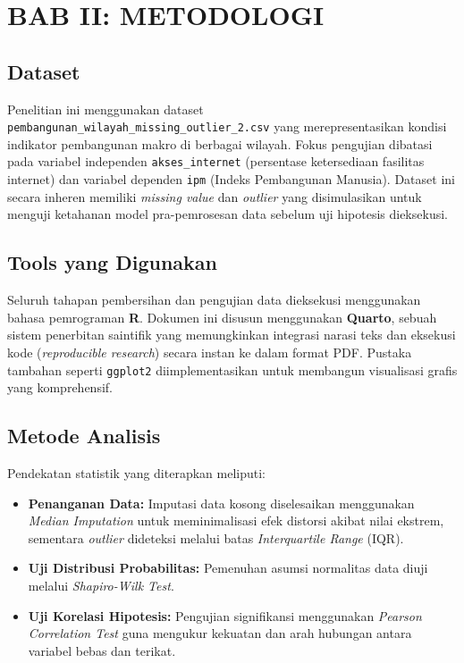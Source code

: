 \documentclass[
  letterpaper,
  DIV=11,
  numbers=noendperiod]{scrartcl}
\providecommand{\tightlist}{%
  \setlength{\itemsep}{0pt}\setlength{\parskip}{0pt}}
\begin{document}
\section{BAB II: METODOLOGI}\label{bab-ii-metodologi}

\subsection{Dataset}\label{dataset}

Penelitian ini menggunakan dataset
\texttt{pembangunan\_wilayah\_missing\_outlier\_2.csv} yang
merepresentasikan kondisi indikator pembangunan makro di berbagai
wilayah. Fokus pengujian dibatasi pada variabel independen
\texttt{akses\_internet} (persentase ketersediaan fasilitas internet)
dan variabel dependen \texttt{ipm} (Indeks Pembangunan Manusia). Dataset
ini secara inheren memiliki \emph{missing value} dan \emph{outlier} yang
disimulasikan untuk menguji ketahanan model pra-pemrosesan data sebelum
uji hipotesis dieksekusi.

\subsection{Tools yang Digunakan}\label{tools-yang-digunakan}

Seluruh tahapan pembersihan dan pengujian data dieksekusi menggunakan
bahasa pemrograman \textbf{R}. Dokumen ini disusun menggunakan
\textbf{Quarto}, sebuah sistem penerbitan saintifik yang memungkinkan
integrasi narasi teks dan eksekusi kode (\emph{reproducible research})
secara instan ke dalam format PDF. Pustaka tambahan seperti
\texttt{ggplot2} diimplementasikan untuk membangun visualisasi grafis
yang komprehensif.

\subsection{Metode Analisis}\label{metode-analisis}

Pendekatan statistik yang diterapkan meliputi:

\begin{itemize}
\tightlist
\item
  \textbf{Penanganan Data:} Imputasi data kosong diselesaikan
  menggunakan \emph{Median Imputation} untuk meminimalisasi efek
  distorsi akibat nilai ekstrem, sementara \emph{outlier} dideteksi
  melalui batas \emph{Interquartile Range} (IQR).
\item
  \textbf{Uji Distribusi Probabilitas:} Pemenuhan asumsi normalitas data
  diuji melalui \emph{Shapiro-Wilk Test}.
\item
  \textbf{Uji Korelasi Hipotesis:} Pengujian signifikansi menggunakan
  \emph{Pearson Correlation Test} guna mengukur kekuatan dan arah
  hubungan antara variabel bebas dan terikat.
\end{itemize}
\end{document}
